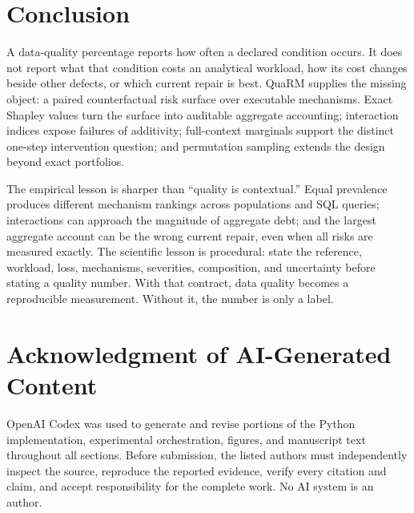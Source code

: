 \documentclass[conference]{IEEEtran}
\newcommand{\method}{QuaRM}
\begin{document}
\section{Conclusion}

A data-quality percentage reports how often a declared condition occurs. It does not report what that condition costs an analytical workload, how its cost changes beside other defects, or which current repair is best. \method{} supplies the missing object: a paired counterfactual risk surface over executable mechanisms. Exact Shapley values turn the surface into auditable aggregate accounting; interaction indices expose failures of additivity; full-context marginals support the distinct one-step intervention question; and permutation sampling extends the design beyond exact portfolios.

The empirical lesson is sharper than ``quality is contextual.'' Equal prevalence produces different mechanism rankings across populations and SQL queries; interactions can approach the magnitude of aggregate debt; and the largest aggregate account can be the wrong current repair, even when all risks are measured exactly. The scientific lesson is procedural: state the reference, workload, loss, mechanisms, severities, composition, and uncertainty before stating a quality number. With that contract, data quality becomes a reproducible measurement. Without it, the number is only a label.




\section*{Acknowledgment of AI-Generated Content}
OpenAI Codex was used to generate and revise portions of the Python implementation, experimental orchestration, figures, and manuscript text throughout all sections. Before submission, the listed authors must independently inspect the source, reproduce the reported evidence, verify every citation and claim, and accept responsibility for the complete work. No AI system is an author.
\end{document}
